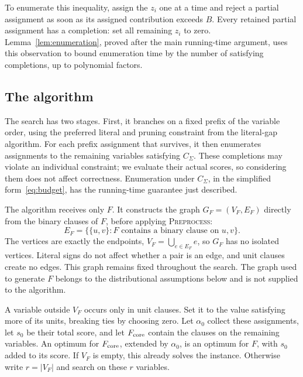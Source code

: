 \documentclass[11pt,a4paper]{article}
\theoremstyle{definition}
\theoremstyle{remark}
\begin{document}
To enumerate this inequality, assign the $z_i$ one at a time and reject
a partial assignment as soon as its assigned contribution exceeds $B$.
Every retained partial assignment has a completion: set all remaining
$z_i$ to zero. Lemma~\ref{lem:enumeration}, proved after the main running-time
argument, uses this observation to bound enumeration time by the number
of satisfying completions, up to polynomial factors.

\subsection{The algorithm}\label{sec:random_algorithm}

The search has two stages. First, it branches on a fixed prefix of the
variable order, using the preferred literal and pruning constraint from
the literal-gap algorithm. For each prefix assignment that survives,
it then enumerates assignments to the remaining variables satisfying
$C_\Sigma$. These completions may violate an individual constraint;
we evaluate their actual scores, so considering them does not affect
correctness. Enumeration under $C_\Sigma$, in the simplified
form~\eqref{eq:budget}, has the running-time guarantee just described.

The algorithm receives only $F$. It constructs the graph
$G_F=(V_F,E_F)$ directly from the binary clauses of $F$, before applying
\textnormal{\textsc{Preprocess}}:
\begin{equation}
 E_F=\bigl\{\{u,v\}:F\text{ contains a binary clause on }u,v\bigr\}.
\label{eq:observed_support}
\end{equation}
The vertices are exactly the endpoints, $V_F=\bigcup_{e\in E_F}e$, so
$G_F$ has no isolated vertices. Literal signs do not affect whether a
pair is an edge, and unit clauses create no edges. This graph remains
fixed throughout the search. The graph used to generate $F$ belongs to
the distributional assumptions below and is not supplied to the algorithm.

A variable outside $V_F$ occurs only in unit clauses. Set it to the value
satisfying more of its units, breaking ties by choosing zero. Let
$\alpha_0$ collect these assignments, let $s_0$ be their total score,
and let $F_{\rm core}$ contain the clauses on the remaining variables.
An optimum for $F_{\rm core}$, extended by $\alpha_0$, is an optimum for
$F$, with $s_0$ added to its score. If $V_F$ is empty, this already solves
the instance. Otherwise write $r=|V_F|$ and search on these $r$ variables.
\end{document}
